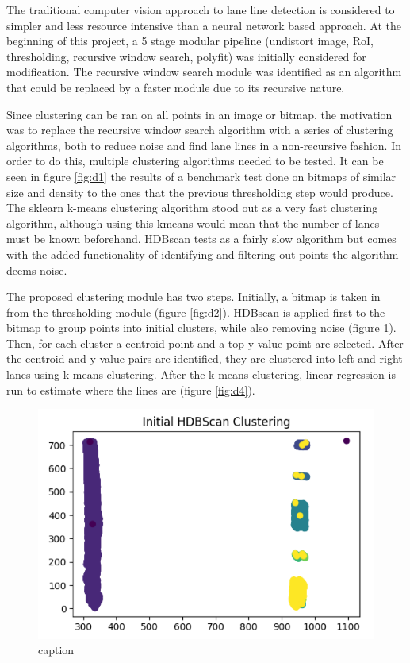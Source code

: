 \documentclass[twoside,twocolumn]{article}
\begin{document}
\par The traditional computer vision approach to lane line detection is considered to simpler and less resource intensive than a neural network based approach. At the beginning of this project, a 5 stage modular pipeline (undistort image, RoI, thresholding, recursive window search, polyfit) was initially considered for modification. The recursive window search module was identified as an algorithm that could be replaced by a faster module due to its recursive nature.
\par Since clustering can be ran on all points in an image or bitmap, the motivation was to replace the recursive window search algorithm with a series of clustering algorithms, both to reduce noise and find lane lines in a non-recursive fashion. In order to do this, multiple clustering algorithms needed to be tested. It can be seen in figure \ref{fig:d1} the results of a benchmark test done on bitmaps of similar size and density to the ones that the previous thresholding step would produce. The sklearn k-means clustering algorithm stood out as a very fast clustering algorithm, although using this kmeans would mean that the number of lanes must be known beforehand. HDBscan tests as a fairly slow algorithm but comes with the added functionality of identifying and filtering out points the algorithm deems noise.
\par The proposed clustering module has two steps. Initially, a bitmap is taken in from the thresholding module (figure \ref{fig:d2}). HDBscan is applied first to the bitmap to group points into initial clusters, while also removing noise (figure \ref{fig:d3}). Then, for each cluster a centroid point and a top y-value point are selected. After the centroid and y-value pairs are identified, they are clustered into left and right lanes using k-means clustering. After the k-means clustering, linear regression is run to estimate where the lines are (figure \ref{fig:d4}).

\begin{figure}
  \includegraphics[width=\linewidth]{daniel3.png}
  \caption{caption}
  \label{fig:d3}
\end{figure}
\end{document}
